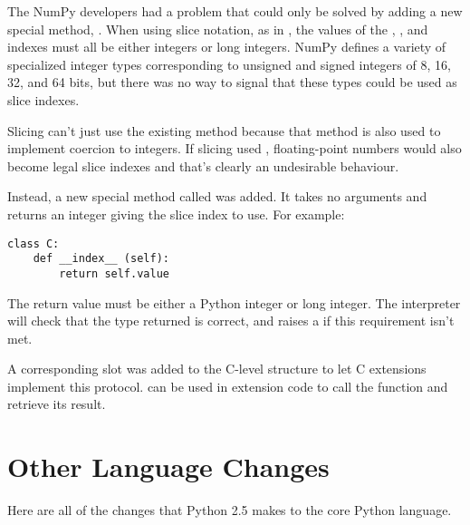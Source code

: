 \documentclass{howto}
\begin{document}
The NumPy developers had a problem that could only be solved by adding
a new special method, .  When using slice notation,
as in , the values of the
, , and  indexes must all be either
integers or long integers.  NumPy defines a variety of specialized
integer types corresponding to unsigned and signed integers of 8, 16,
32, and 64 bits, but there was no way to signal that these types could
be used as slice indexes.

Slicing can't just use the existing  method because
that method is also used to implement coercion to integers.  If
slicing used , floating-point numbers would also
become legal slice indexes and that's clearly an undesirable
behaviour.

Instead, a new special method called  was added.  It
takes no arguments and returns an integer giving the slice index to
use.  For example:

\begin{verbatim}
class C:
    def __index__ (self):
        return self.value  
\end{verbatim}

The return value must be either a Python integer or long integer.
The interpreter will check that the type returned is correct, and
raises a  if this requirement isn't met.

A corresponding  slot was added to the C-level
 structure to let C extensions implement this
protocol.   can be used in
extension code to call the  function and retrieve
its result.

\begin{seealso}


\end{seealso}


\section{Other Language Changes\label{other-lang}}

Here are all of the changes that Python 2.5 makes to the core Python
language.
\end{document}
